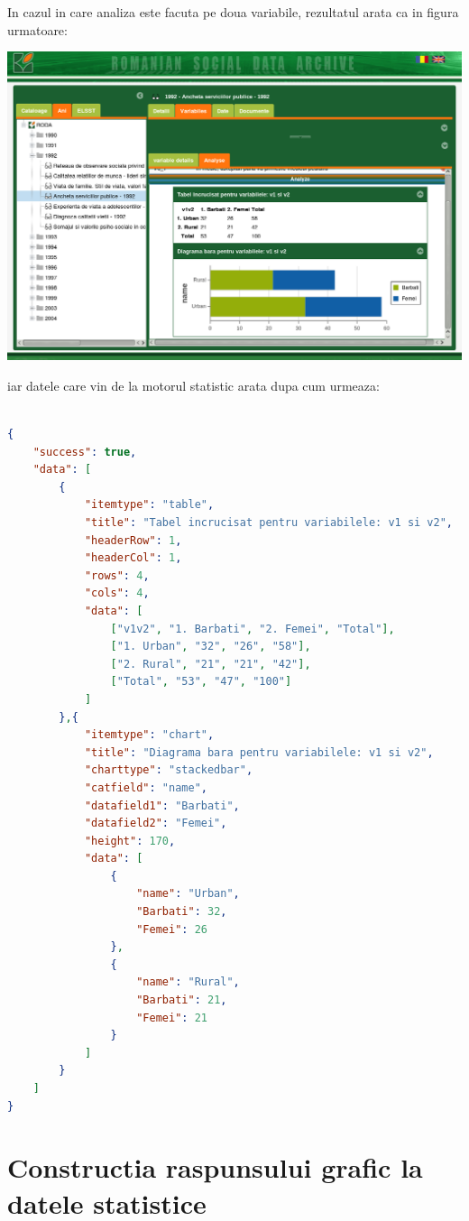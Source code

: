 In cazul in care analiza este facuta pe doua variabile, rezultatul arata ca in figura urmatoare:

\includegraphics[width=16cm]{img/db-bivar}


iar datele care vin de la motorul statistic arata dupa cum urmeaza:

\begin{lstlisting}[language=json]

{
    "success": true,
    "data": [
        {
            "itemtype": "table",
            "title": "Tabel incrucisat pentru variabilele: v1 si v2",
            "headerRow": 1,
            "headerCol": 1,
            "rows": 4,
            "cols": 4,
            "data": [
                ["v1v2", "1. Barbati", "2. Femei", "Total"],
                ["1. Urban", "32", "26", "58"],
                ["2. Rural", "21", "21", "42"],
                ["Total", "53", "47", "100"]
            ]
        },{
            "itemtype": "chart",
            "title": "Diagrama bara pentru variabilele: v1 si v2",
            "charttype": "stackedbar",
            "catfield": "name",
            "datafield1": "Barbati",
            "datafield2": "Femei",
            "height": 170,
            "data": [
                {
                    "name": "Urban",
                    "Barbati": 32,
                    "Femei": 26
                },
                {
                    "name": "Rural",
                    "Barbati": 21,
                    "Femei": 21
                }
            ]
        }
    ]
}

\end{lstlisting}

\section{Constructia raspunsului grafic la datele statistice}

